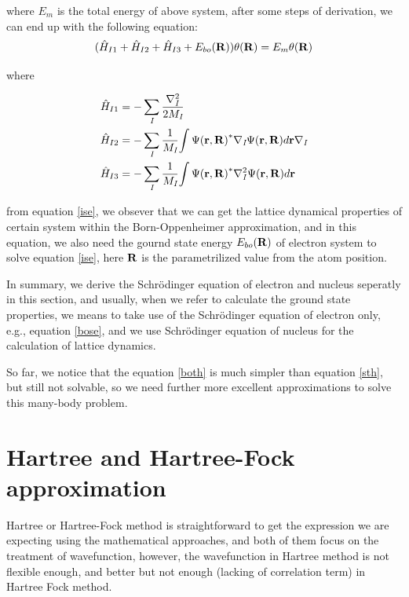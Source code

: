 \documentclass[a4paper]{report}
\begin{document}
\noindent where $E_{m}$ is the total energy of above system, after some steps of derivation, we can end up with the following equation:
\begin{equation}\label{ise}
( \hat{H}_{I1}+\hat{H}_{I2}+\hat{H}_{I3}+E_{bo}({\bf R}) ) {\theta(\bf{R})} = {E_m} {\theta(\bf{R})}
\end{equation}

\noindent where

\begin{equation}\begin{split}
 &  \hat{H}_{I1} = - \sumi<I> \frac{{{\nabla}_{\textit{I}}^{2}}}{2 M_\textit{I}}   \\
 &  \hat{H}_{I2} = - \sumi<I> \frac{1}{M_\textit{I}} {\int {\Psi(\bf{r}, \bf{R})}^{\ast} {{\nabla}_{\textit{I}}} {\Psi(\bf{r}, \bf{R})} d {\bf r }} {{\nabla}_{\textit{I}}} \\
 &  \hat{H}_{I3} = - \sumi<I> \frac{1}{M_\textit{I}} {\int {\Psi(\bf{r}, \bf{R})}^{\ast} {{\nabla}_{\textit{I}}^{2}} {\Psi(\bf{r}, \bf{R})} d {\bf r }} 
\end{split}\end{equation}

\noindent from equation \ref{ise}, we obsever that we can get the lattice dynamical properties of certain system within the Born-Oppenheimer approximation, and in this equation,
we also need the gournd state energy $E_{bo}({\bf R})$ of electron system to solve equation \ref{ise}, here $\bf R$ is the parametrilized value from the atom position.
 

\noindent In summary, we derive the Schrödinger equation of electron and nucleus seperatly in this section, and usually, when we refer to calculate the ground state properties,
we means to take use of the Schrödinger equation of electron only, e.g., equation \ref{bose}, and we use Schrödinger equation of nucleus for the calculation of lattice dynamics.

So far, we notice that the equation \ref{both} is much simpler than equation \ref{sth}, but still not solvable, so we need further more excellent approximations 
to solve this many-body problem.


\section{Hartree and Hartree-Fock approximation}
\noindent Hartree or Hartree-Fock method is straightforward to get the 
expression we are expecting using the mathematical approaches, and both of them focus on the treatment of wavefunction, however, the wavefunction in Hartree method is not 
flexible enough, and better but not enough (lacking of correlation term) in Hartree Fock method.
\end{document}
